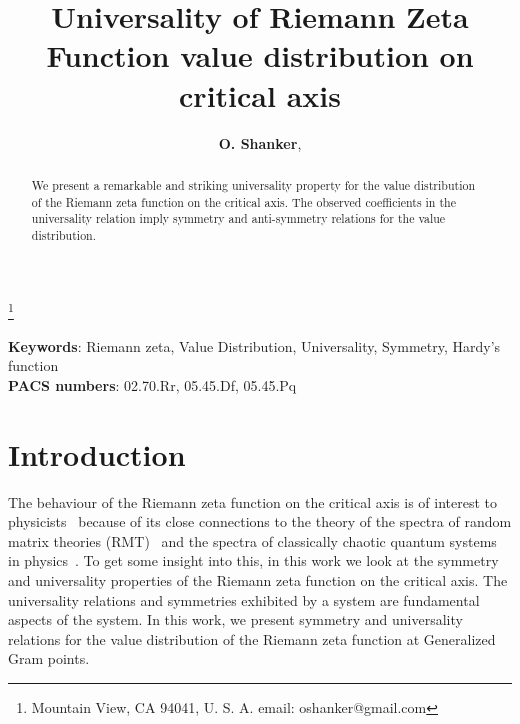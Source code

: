 \documentclass[twoside]{article}
\begin{document}


\newtheorem{theorem}{Theorem}[section]
\newtheorem{lemma}[theorem]{Lemma}

\theoremstyle{definition}
\newtheorem{definition}[theorem]{Definition}
\newtheorem{example}[theorem]{Example}
\newtheorem{xca}[theorem]{Exercise}

\theoremstyle{remark}
\newtheorem{remark}[theorem]{Remark}



\date{}
\lhead[]{}
\rhead[]{}

\title{\bf{Universality of Riemann Zeta Function value distribution on critical axis}}

\maketitle


\author{{\textbf{O. Shanker}},}
\thanks{ Mountain View, CA 94041, U. S. A. email: oshanker@gmail.com}

\thispagestyle{fancy}

\begin{abstract}
We present a remarkable and striking universality property for the value distribution
of the Riemann zeta function on the critical axis. The observed coefficients 
in the universality relation imply
symmetry and anti-symmetry relations for the value distribution.

\end{abstract}
{\textbf {Keywords}:} Riemann zeta, Value Distribution, Universality, Symmetry, Hardy's function
\\
{\textbf {PACS numbers}:}  02.70.Rr, 05.45.Df, 05.45.Pq


\symbolfootnote[0]{\bf{* }}


\section{Introduction}
The behaviour of the Riemann zeta function on the critical axis is of interest to 
physicists~\cite{Shanker 2006} because of
its close connections  to the theory of the spectra of random matrix theories 
(RMT)~\cite{Wigner 1967, Gaudin 1960, Gaudin 1961, Dyson 1962} 
and the spectra of classically chaotic quantum systems in 
physics~\cite{Berry 1985,Berry 1986,Berry 1987,Berry 1988}. 
To get some insight into this, 
in this work
we look at the symmetry and universality properties of the Riemann zeta function 
on the critical axis.
The universality relations and symmetries exhibited by a system are fundamental aspects of the system. 
In this work, we present symmetry and universality relations for the value
distribution of the Riemann zeta function at Generalized Gram points.
\end{document}
